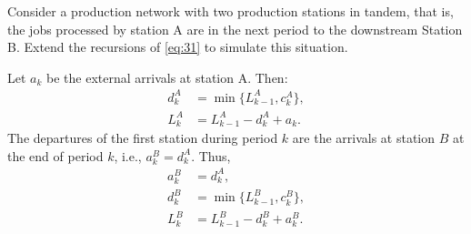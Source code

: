 \begin{exercise}
  Consider a production network with two production stations in
  tandem, that is, the jobs processed by station A are in the next
  period to the downstream Station B.  Extend the recursions of
  \cref{eq:31} to simulate this situation.
\begin{solution}
  Let $a_k$ be the external arrivals at station A. Then:
\begin{equation}
  \begin{split}
    d^A_k &= \min\{L_{k-1}^A, c_k^A\}, \\
    L_k^A &= L_{k-1}^A -d_k^A + a_k.
  \end{split}
\end{equation}
The departures of the first station during period $k$ are the arrivals
at station $B$ at the end of period $k$, i.e., $a_k^B =
d_{k}^A$. Thus,
\begin{equation}
  \begin{split}
    a_k^B &= d_{k}^A,\\
    d^B_k &= \min\{L_{k-1}^B, c_k^B\}, \\
    L_k^B &= L_{k-1}^B -d_k^B + a_k^B.
  \end{split}
\end{equation}
\end{solution}
\end{exercise}

